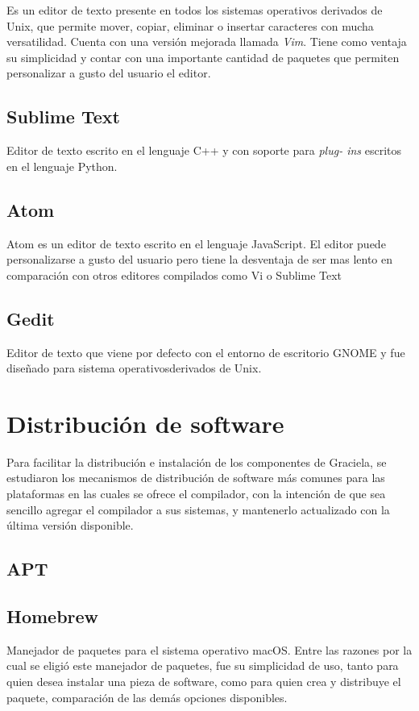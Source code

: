 Es un editor de texto presente en todos los sistemas operativos derivados de
Unix, que  permite mover, copiar, eliminar o insertar caracteres con mucha
versatilidad. Cuenta con una versión mejorada llamada \textit{Vim}. Tiene como
ventaja su simplicidad y contar con una importante cantidad de paquetes que
permiten personalizar a gusto del usuario el editor.

\subsection{Sublime Text}

Editor de texto escrito en el lenguaje C++ y con soporte para \textit{plug-
ins} escritos en el lenguaje Python. 

\subsection{Atom}

Atom es un editor de texto escrito en el lenguaje JavaScript. El editor puede
personalizarse a gusto del usuario pero tiene la desventaja de ser mas lento
en comparación con otros editores compilados como Vi o Sublime Text

\subsection{Gedit}

Editor de texto que viene por defecto con el entorno de escritorio GNOME y fue
diseñado para sistema operativosderivados de Unix.

\section{Distribución de software}

Para facilitar la distribución e instalación de los componentes de Graciela, se
estudiaron los mecanismos de distribución de software más comunes para las
plataformas en las cuales se ofrece el compilador, con la intención de que sea
sencillo agregar el compilador a sus sistemas, y mantenerlo actualizado con la
última versión disponible.

\subsection{APT}

\subsection{Homebrew}

Manejador de paquetes para el sistema operativo macOS. Entre las razones por
la cual se eligió este manejador de paquetes, fue su simplicidad de uso, tanto
para quien desea instalar una pieza de software, como para quien crea y
distribuye el paquete, comparación de las demás opciones disponibles.
